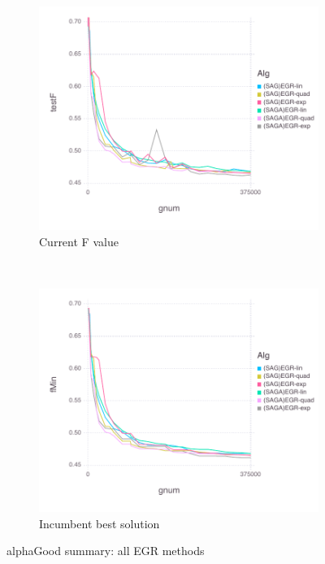 \documentclass[11pt]{article}
\begin{document}
   \begin{figure}[H]
       \centering
       \begin{subfigure}[b]{0.45\textwidth}
           \includegraphics[width=\textwidth]{Figures/alphaGoodBLtrueFfFinal-1.pdf}
           \caption{Current F value}
       \end{subfigure}
       ~ %
         \begin{subfigure}[b]{0.45\textwidth}
             \includegraphics[width=\textwidth]{Figures/alphaGoodBLtrueFminfFinal-2.pdf}
             \caption{Incumbent best solution}
         \end{subfigure}
       \caption{alphaGood summary: all EGR methods}\label{fig:alphaGoodsummary}
   \end{figure}
\end{document}
